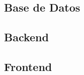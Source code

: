 \documentclass{article}
\begin{document}
\subsection{Base de Datos}

\subsection{Backend}

\subsection{Frontend}
\end{document}
